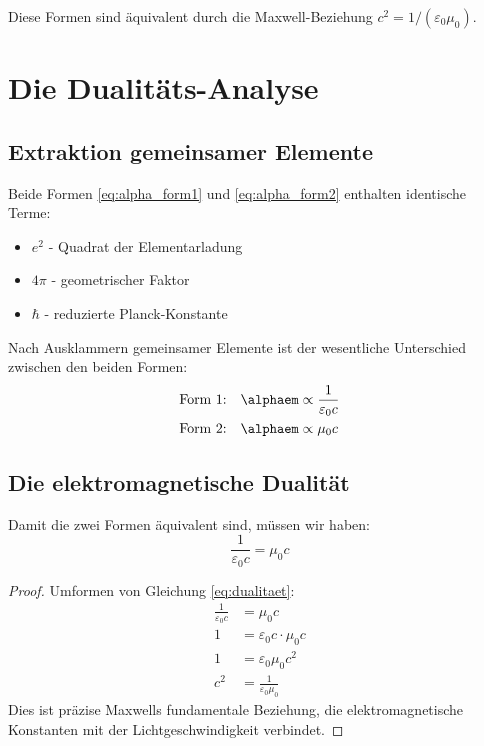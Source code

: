 	Diese Formen sind äquivalent durch die Maxwell-Beziehung $c^2 = 1/(\varepsilon_0\mu_0)$.
	
	\section{Die Dualitäts-Analyse}
	
	\subsection{Extraktion gemeinsamer Elemente}
	
	\begin{proof_step}
		Beide Formen \eqref{eq:alpha_form1} und \eqref{eq:alpha_form2} enthalten identische Terme:
		\begin{itemize}
			\item $e^2$ - Quadrat der Elementarladung
			\item $4\pi$ - geometrischer Faktor
			\item $\hbar$ - reduzierte Planck-Konstante
		\end{itemize}
	\end{proof_step}
	
	\begin{proof_step}
		Nach Ausklammern gemeinsamer Elemente ist der wesentliche Unterschied zwischen den beiden Formen:
		\begin{align}
			\text{Form 1:} \quad \alphaem &\propto \frac{1}{\varepsilon_0 c} \label{eq:diff1}\\
			\text{Form 2:} \quad \alphaem &\propto \mu_0 c \label{eq:diff2}
		\end{align}
	\end{proof_step}
	
	\subsection{Die elektromagnetische Dualität}
	
	\begin{theorem}
		Damit die zwei Formen äquivalent sind, müssen wir haben:
		\begin{equation}
			\frac{1}{\varepsilon_0 c} = \mu_0 c \label{eq:dualitaet}
		\end{equation}
	\end{theorem}
	
	\begin{proof}
		Umformen von Gleichung \eqref{eq:dualitaet}:
		\begin{align}
			\frac{1}{\varepsilon_0 c} &= \mu_0 c\\
			1 &= \varepsilon_0 c \cdot \mu_0 c\\
			1 &= \varepsilon_0 \mu_0 c^2\\
			c^2 &= \frac{1}{\varepsilon_0 \mu_0}
		\end{align}
		Dies ist präzise Maxwells fundamentale Beziehung, die elektromagnetische Konstanten mit der Lichtgeschwindigkeit verbindet.
	\end{proof}
	
